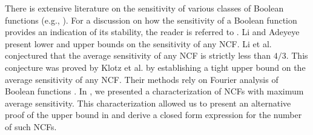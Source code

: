 There is extensive literature on the sensitivity of various classes
of Boolean functions
(e.g., \cite{Buhrman-etal-2002,Nisan-etal-1994,Zhang-2011}).
For a discussion on how the sensitivity of a Boolean function provides
an indication of its stability, the reader is referred to \cite{Kauffman-etal-2004,
Layne-2011,Layne-etal-2012}.
Li and Adeyeye \cite{Li-etal-2012} present lower and upper bounds on the
sensitivity of any NCF.
Li et al. \cite{Li-etal-2011,Li-etal-2013} conjectured that the average
sensitivity of any NCF is strictly less than  $4/3$.
This conjecture was proved by Klotz et al. \cite{Klotz-etal-2013} by establishing
a tight upper bound on the average sensitivity of any NCF.
Their methods rely on Fourier analysis of Boolean functions
\cite{Odonnell-2014}.
In \cite{Stearns-etal-2018}, 
we presented a characterization of NCFs with maximum average sensitivity.
This characterization allowed us to present an alternative proof 
of the upper bound in \cite{Klotz-etal-2013} and derive a closed
form expression for the number of such NCFs.
